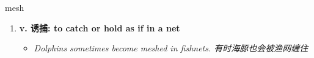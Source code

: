 
\begin{frame}
{\huge mesh}
\begin{center}
\begin{enumerate}\Large
  \item \textbf{v. 诱捕: to catch or hold as if in a net}
  \begin{itemize}
    \item \em{\Large{Dolphins sometimes become meshed in fishnets. 有时海豚也会被渔网缠住}}
  \end{itemize}
\end{enumerate}
\end{center}
\end{frame}
